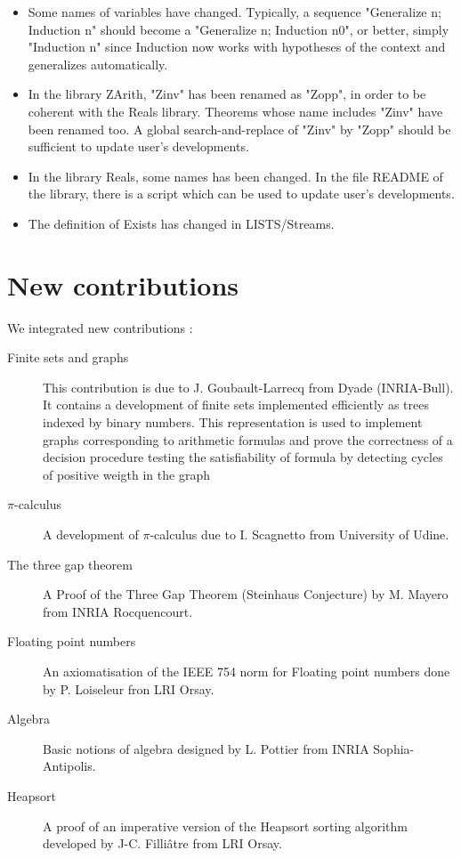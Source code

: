 \documentclass[11pt]{article}
\begin{document}
  \begin{itemize}
 
  \item Some names of variables have changed. Typically, a sequence
   "Generalize n; Induction n" should become a "Generalize n; Induction n0",
   or better, simply "Induction n" since Induction now works with
   hypotheses of the context and generalizes automatically.

  \item In the library ZArith, "Zinv" has been renamed as "Zopp", in
    order to be coherent with the Reals library. Theorems whose name
    includes "Zinv" have been renamed too. A global search-and-replace
    of "Zinv" by "Zopp" should be sufficient to update user's
    developments.

 \item In the library Reals, some names has been changed. 
   In the file README of the library, there is a script which can be
   used to update user's developments.

  \item The definition of Exists has changed in LISTS/Streams.

  \end{itemize}

\section{New contributions}
We integrated new contributions :
\begin{description}
\item[Finite sets and graphs] 
This contribution is due to J. Goubault-Larrecq from Dyade
  (INRIA-Bull). It contains a
development of finite sets implemented efficiently
as trees indexed by binary numbers. This representation is used to
implement graphs corresponding to arithmetic formulas and prove the
correctness of a decision procedure testing the satisfiability of
formula by detecting cycles of positive weigth in the graph
\item[$\pi$-calculus] A development of $\pi$-calculus  due to 
I. Scagnetto from  University of Udine.
\item[The three gap theorem] A Proof of the Three Gap Theorem
  (Steinhaus Conjecture) by M. Mayero from INRIA Rocquencourt.
\item[Floating point numbers] An axiomatisation of the IEEE 754 
norm for Floating point numbers done by P. Loiseleur fron LRI Orsay.
\item[Algebra] Basic notions of algebra designed by L. Pottier from
  INRIA Sophia-Antipolis.
\item[Heapsort] A proof of an imperative version  of the
  Heapsort sorting algorithm developed by J-C. Filli\^atre from 
LRI Orsay.

\end{description}
\end{document}
